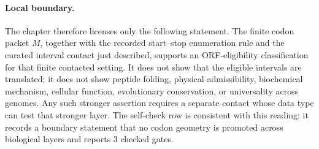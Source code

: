 \paragraph{Local boundary.}
The chapter therefore licenses only the following statement.  The finite codon packet $M$, together with the recorded start--stop enumeration rule and the curated interval contact just described, supports an ORF-eligibility classification for that finite contacted setting.  It does not show that the eligible intervals are translated; it does not show peptide folding, physical admissibility, biochemical mechanism, cellular function, evolutionary conservation, or universality across genomes.  Any such stronger assertion requires a separate contact whose data type can test that stronger layer.  The self-check row is consistent with this reading: it records a boundary statement that no codon geometry is promoted across biological layers and reports $3$ checked gates.